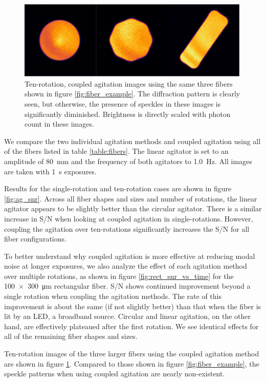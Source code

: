 \documentclass[twocolumn]{emulateapj}
\begin{document}
\begin{figure}
\centering
	\includegraphics[width=\columnwidth]{images/fiber_improved.pdf}
	\caption{Ten-rotation, coupled agitation images using the same three fibers shown in figure \ref{fig:fiber_example}.  The diffraction pattern is clearly seen, but otherwise, the presence of speckles in these images is significantly diminished. Brightness is directly scaled with photon count in these images.}
\label{fig:fiber_improved}
\end{figure}

We compare the two individual agitation methods and coupled agitation using all of the fibers listed in table \ref{table:fibers}. The linear agitator is set to an amplitude of \SI{80}{\milli\meter} and the frequency of both agitators to \SI{1.0}{\hertz}. All images are taken with \SI{1}{\second} exposures.

Results for the single-rotation and ten-rotation cases are shown in figure \ref{fig:ag_snr}. Across all fiber shapes and sizes and number of rotations, the linear agitator appears to be slightly better than the circular agitator. There is a similar increase in S/N when looking at coupled agitation in single-rotations. However, coupling the agitation over ten-rotations significantly increases the S/N for all fiber configurations.

To better understand why coupled agitation is more effective at reducing modal noise at longer exposures, we also analyze the effect of each agitation method over multiple rotations, as shown in figure \ref{fig:rect_snr_vs_time} for the \SI{100x300}{\micro\meter} rectangular fiber. S/N shows continued improvement beyond a single rotation when coupling the agitation methods. The rate of this improvement is about the same (if not slightly better) than that when the fiber is lit by an LED, a broadband source. Circular and linear agitation, on the other hand, are effectively plateaued after the first rotation. We see identical effects for all of the remaining fiber shapes and sizes.

Ten-rotation images of the three larger fibers using the coupled agitation method are shown in figure \ref{fig:fiber_improved}. Compared to those shown in figure \ref{fig:fiber_example}, the speckle patterns when using coupled agitation are nearly non-existent.
\end{document}
